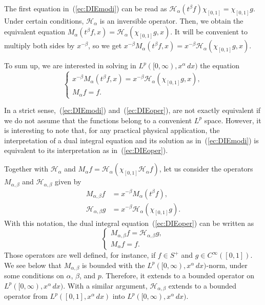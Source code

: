\documentclass[12pt,leqno]{amsart}
\theoremstyle{plain}
\newcommand{\htra}{\mathcal{H}_\alpha} %
\newcommand{\hab}{\mathcal{H}_{\alpha,\beta}}
\begin{document}
The first equation in~(\ref{ec:DIEmodi}) can be read as $\htra(t^\beta f)
\chi_{[0,1]} = \chi_{[0,1]}g$. Under certain conditions, $\htra$ is an
inversible operator. Then, we obtain the equivalent equation
$M_{\alpha}(t^{\beta}f,x) = \htra(\chi_{[0,1]}g,x)$. It will be convenient to
multiply both sides by $x^{-\beta}$, so we get
$x^{-\beta}M_{\alpha}(t^{\beta}f,x) = x^{-\beta}\htra(\chi_{[0,1]}g,x)$.

To sum up, we are interested in solving in $L^p([0,\infty),x^{\alpha}\,dx)$
the equation
\begin{equation}
    \label{ec:DIEoper}
    \left\{
      \begin{array}{l}
         x^{-\beta}M_{\alpha}(t^{\beta}f,x)
           = x^{-\beta}\htra(\chi_{[0,1]}g,x), \\[3pt]
         M_{\alpha}f = f. 
      \end{array}
    \right.
\end{equation}

In a strict sense,~(\ref{ec:DIEmodi}) and~(\ref{ec:DIEoper}),
are not exactly equivalent if we do not assume that the functions belong to a
convenient $L^p$ space. However, it is interesting to note that, for any
practical physical application, the interpretation of a dual integral
equation and its solution as in~(\ref{ec:DIEmodi}) is equivalent to its
interpretation as in~(\ref{ec:DIEoper}).

Together with $\htra$ and $M_{\alpha}f = \htra(\chi_{[0,1]}\htra f)$, let us
consider the operators $M_{\alpha,\beta}$ and $\hab$ given by
\begin{align*}
    M_{\alpha,\beta}f &= x^{-\beta}M_{\alpha}(t^{\beta}f),\\
    \hab g &= x^{-\beta}\htra(\chi_{[0,1]}g).
\end{align*}
With this notation, the dual integral equation~(\ref{ec:DIEoper}) can be
written as
\begin{equation}
    \label{ec:DIEfinal}
    \left\{
      \begin{array}{l}
         M_{\alpha,\beta}f = \hab g, \\[3pt]
         M_{\alpha}f = f.
      \end{array}
    \right.
\end{equation}
Those operators are well defined, for instance, if $f \in S^+$ and $g \in
C^\infty([0,1])$. We see below that $M_{\alpha,\beta}$ is bounded with the
$L^p([0,\infty), x^\alpha \, dx)$-norm, under some conditions on $\alpha$,
$\beta$, and $p$. Therefore, it extends to a bounded operator on
$L^p([0,\infty), x^\alpha \, dx)$. With a similar argument, $\hab$ extends to
a bounded operator from $L^p([0,1], x^\alpha \, dx)$ into $L^p([0,\infty),
x^\alpha \, dx)$.
\end{document}
